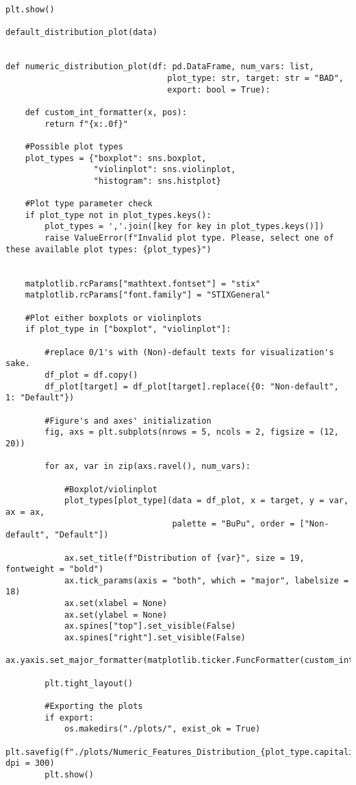 \begin{lstlisting}[basicstyle=\footnotesize\ttfamily]
    plt.show()

default_distribution_plot(data)


def numeric_distribution_plot(df: pd.DataFrame, num_vars: list,
                                 plot_type: str, target: str = "BAD", 
                                 export: bool = True):

    def custom_int_formatter(x, pos):
        return f"{x:.0f}"

    #Possible plot types
    plot_types = {"boxplot": sns.boxplot,
                  "violinplot": sns.violinplot,
                  "histogram": sns.histplot}

    #Plot type parameter check
    if plot_type not in plot_types.keys():
		plot_types = ','.join([key for key in plot_types.keys()])
        raise ValueError(f"Invalid plot type. Please, select one of these available plot types: {plot_types}")

        
    matplotlib.rcParams["mathtext.fontset"] = "stix"
    matplotlib.rcParams["font.family"] = "STIXGeneral"
    
    #Plot either boxplots or violinplots
    if plot_type in ["boxplot", "violinplot"]:
        
        #replace 0/1's with (Non)-default texts for visualization's sake.
        df_plot = df.copy()
        df_plot[target] = df_plot[target].replace({0: "Non-default", 1: "Default"})

        #Figure's and axes' initialization
        fig, axs = plt.subplots(nrows = 5, ncols = 2, figsize = (12, 20))

        for ax, var in zip(axs.ravel(), num_vars):
            
            #Boxplot/violinplot
            plot_types[plot_type](data = df_plot, x = target, y = var, ax = ax,
                                  palette = "BuPu", order = ["Non-default", "Default"])

            ax.set_title(f"Distribution of {var}", size = 19, fontweight = "bold")
            ax.tick_params(axis = "both", which = "major", labelsize = 18)
            ax.set(xlabel = None)
            ax.set(ylabel = None)
            ax.spines["top"].set_visible(False)
            ax.spines["right"].set_visible(False)
            ax.yaxis.set_major_formatter(matplotlib.ticker.FuncFormatter(custom_int_formatter))
        
        plt.tight_layout()

        #Exporting the plots
        if export:
            os.makedirs("./plots/", exist_ok = True)
            plt.savefig(f"./plots/Numeric_Features_Distribution_{plot_type.capitalize()}s.jpg", dpi = 300)
        plt.show()



\end{lstlisting}
